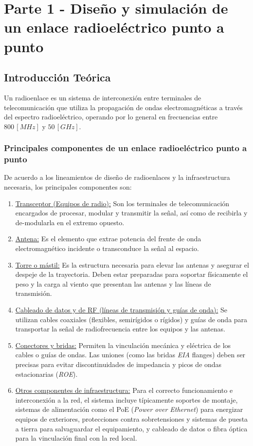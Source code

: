 \section{Parte 1 - Diseño y simulación de un enlace radioeléctrico punto a punto}
\label{sec_2}
\subsection{Introducción Teórica}
\label{sec_2.1}
Un radioenlace es un sistema de interconexión entre terminales de telecomunicación que utiliza la propagación de ondas electromagnéticas a través del espectro radioeléctrico, operando por lo general en frecuencias entre $800 \, [MHz]$ y $50 \, [GHz]$. \cite{b1}


\subsubsection{Principales componentes de un enlace radioeléctrico punto a punto}
\label{sec_2.1.1}
De acuerdo a los lineamientos de diseño de radioenlaces y la infraestructura necesaria, los principales componentes son:
\begin{enumerate}
    \item \underline{Transceptor (Equipos de radio):} Son los terminales de telecomunicación encargados de procesar, modular y transmitir la señal, así como de recibirla y de-modularla en el extremo opuesto.
    \item \underline{Antena:} Es el elemento que extrae potencia del frente de onda electromagnético incidente o transconduce la señal al espacio.
    \item \underline{Torre o mástil:} Es la estructura necesaria para elevar las antenas y asegurar el despeje de la trayectoria. Deben estar preparadas para soportar físicamente el peso y la carga al viento que presentan las antenas y las líneas de transmisión.
    \item \underline{Cableado de datos y de RF (líneas de transmisión y guías de onda):} Se utilizan cables coaxiales (flexibles, semirígidos o rígidos) y guías de onda para transportar la señal de radiofrecuencia entre los equipos y las antenas.
    \item \underline{Conectores y bridas:} Permiten la vinculación mecánica y eléctrica de los cables o guías de ondas. Las uniones (como las bridas \textit{EIA} flanges) deben ser precisas para evitar discontinuidades de impedancia y picos de ondas estacionarias (\textit{ROE}).
    \item \underline{Otros componentes de infraestructura:} Para el correcto funcionamiento e interconexión a la red, el sistema incluye típicamente soportes de montaje, sistemas de alimentación como el PoE (\textit{Power over Ethernet}) para energizar equipos de exteriores, protecciones contra sobretensiones y sistemas de puesta a tierra para salvaguardar el equipamiento, y cableado de datos o fibra óptica para la vinculación final con la red local. \cite{b1}
\end{enumerate}


